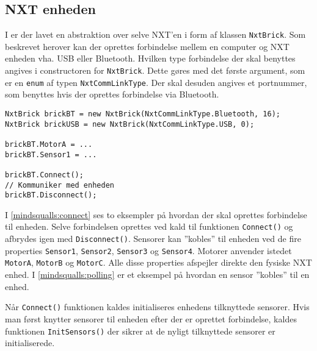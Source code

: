 \subsection{NXT enheden}
I \mindsqualls er der lavet en abstraktion over selve NXT'en i form af klassen \lstinline[style=csharp]!NxtBrick!.
Som beskrevet herover kan der oprettes forbindelse mellem en computer og NXT enheden vha. USB eller Bluetooth.
Hvilken type forbindelse der skal benyttes angives i constructoren for \lstinline[style=csharp]!NxtBrick!.
Dette gøres med det første argument, som er en \lstinline[style=csharp]!enum! af typen \lstinline[style=csharp]!NxtCommLinkType!.
Der skal desuden angives et portnummer, som benyttes hvis der oprettes forbindelse via Bluetooth.

\begin{lstlisting}[style=csharpsmall,caption={Forbindelse til NXT enheder},label=mindsqualls:connect]
NxtBrick brickBT = new NxtBrick(NxtCommLinkType.Bluetooth, 16);
NxtBrick brickUSB = new NxtBrick(NxtCommLinkType.USB, 0);

brickBT.MotorA = ...
brickBT.Sensor1 = ...

brickBT.Connect();
// Kommuniker med enheden
brickBT.Disconnect();
\end{lstlisting}

I \cref{mindsqualls:connect} ses to eksempler på hvordan der skal oprettes forbindelse til enheden.
Selve forbindelsen oprettes ved kald til funktionen \lstinline[style=csharp]!Connect()! og afbrydes igen med \lstinline[style=csharp]!Disconnect()!.
Sensorer kan ''kobles'' til enheden ved de fire properties \lstinline[style=csharp]!Sensor1!, \lstinline[style=csharp]!Sensor2!, \lstinline[style=csharp]!Sensor3! og \lstinline[style=csharp]!Sensor4!.
Motorer anvender istedet \lstinline[style=csharp]!MotorA!, \lstinline[style=csharp]!MotorB! og \lstinline[style=csharp]!MotorC!.
Alle disse properties afspejler direkte den fysiske NXT enhed.
I \cref{mindsqualls:polling} er et eksempel på hvordan en sensor ''kobles'' til en enhed.

Når \lstinline[style=csharp]!Connect()! funktionen kaldes initialiseres enhedens tilknyttede sensorer.
Hvis man først knytter sensorer til enheden efter der er oprettet forbindelse, kaldes funktionen \lstinline[style=csharp]!InitSensors()! der sikrer at de nyligt tilknyttede sensorer er initialiserede.

